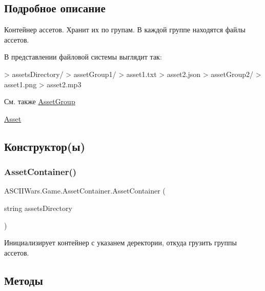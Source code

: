 \subsection{Подробное описание}
Контейнер ассетов. Хранит их по групам. В каждой группе находятся файлы ассетов. 

В представлении файловой системы выглядит так\+: 
\begin{DoxyCode}
> assetsDirectory/
>     assetGroup1/
>         asset1.txt
>         asset2.json
>     assetGroup2/
>         asset1.png
>         asset2.mp3
\end{DoxyCode}


\begin{DoxySeeAlso}{См. также}
\hyperlink{class_a_s_c_i_i_wars_1_1_game_1_1_asset_group}{Asset\+Group} 

\hyperlink{class_a_s_c_i_i_wars_1_1_game_1_1_asset}{Asset} 
\end{DoxySeeAlso}


\subsection{Конструктор(ы)}
\hypertarget{class_a_s_c_i_i_wars_1_1_game_1_1_asset_container_afb55a3f711d67504b677fc2bc38718cc}{}\label{class_a_s_c_i_i_wars_1_1_game_1_1_asset_container_afb55a3f711d67504b677fc2bc38718cc} 
\subsubsection{\texorpdfstring{Asset\+Container()}{AssetContainer()}}
{\footnotesize\ttfamily A\+S\+C\+I\+I\+Wars.\+Game.\+Asset\+Container.\+Asset\+Container (\begin{DoxyParamCaption}\item[{string}]{assets\+Directory }\end{DoxyParamCaption})\hspace{0.3cm}{\ttfamily [inline]}}

Инициализирует контейнер с указанем деректории, откуда грузить группы ассетов. 

\subsection{Методы}
\hypertarget{class_a_s_c_i_i_wars_1_1_game_1_1_asset_container_a73cb91685f397df31d2a18d8b59b3093}{}\label{class_a_s_c_i_i_wars_1_1_game_1_1_asset_container_a73cb91685f397df31d2a18d8b59b3093} 
